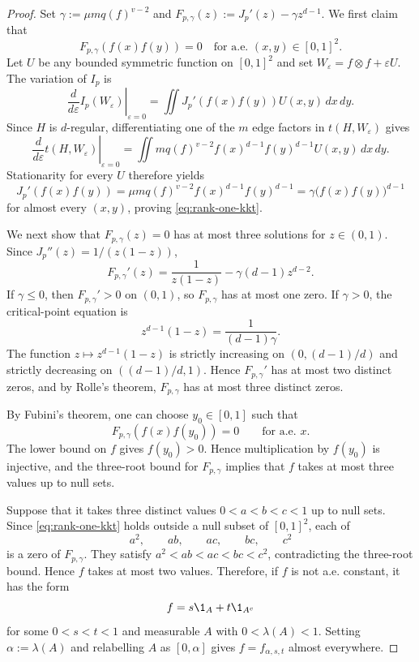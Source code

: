 \begin{proof}
Set $\gamma:=\mu m q(f)^{v-2}$ and $F_{p,\gamma}(z):=J_p'(z)-\gamma z^{d-1}$.
We first claim that
\begin{equation}
\label{eq:rank-one-kkt}
  F_{p,\gamma}(f(x)f(y))=0
  \quad\text{for a.e. }(x,y)\in[0,1]^2.
\end{equation}
Let $U$ be any bounded symmetric function on $[0,1]^2$ and set
$W_\varepsilon=f\otimes f+\varepsilon U$.  The variation of $I_p$ is
\[
  \left.\frac{d}{d\varepsilon}I_p(W_\varepsilon)\right|_{\varepsilon=0}
  =\iint J_p'(f(x)f(y))U(x,y)\,dx\,dy.
\]
Since $H$ is $d$-regular, differentiating one of the $m$ edge factors in
$t(H,W_\varepsilon)$ gives
\[
  \left.\frac{d}{d\varepsilon}t(H,W_\varepsilon)\right|_{\varepsilon=0}
  =\iint m q(f)^{v-2}f(x)^{d-1}f(y)^{d-1}
  U(x,y)\,dx\,dy.
\]
Stationarity for every $U$ therefore yields
\[
  J_p'(f(x)f(y))
  =\mu m q(f)^{v-2}f(x)^{d-1}f(y)^{d-1}
  =\gamma\bigl(f(x)f(y)\bigr)^{d-1}
\]
for almost every $(x,y)$, proving
\eqref{eq:rank-one-kkt}.

We next show that $F_{p,\gamma}(z)=0$ has at most three
solutions for $z\in(0,1)$.  Since $J_p''(z)=1/(z(1-z))$,
\[
  F_{p,\gamma}'(z)
  =\frac1{z(1-z)}-\gamma(d-1)z^{d-2}.
\]
If $\gamma\le0$, then $F_{p,\gamma}'>0$ on $(0,1)$, so
$F_{p,\gamma}$ has at most one zero.  If $\gamma>0$, the critical-point
equation is
\[
  z^{d-1}(1-z)=\frac1{(d-1)\gamma}.
\]
The function $z\mapsto z^{d-1}(1-z)$ is strictly increasing on
$(0,(d-1)/d)$ and strictly decreasing on $((d-1)/d,1)$.  Hence
$F_{p,\gamma}'$ has at most two distinct zeros,
and by Rolle's theorem, $F_{p,\gamma}$ has at most three distinct zeros.

By Fubini's theorem, one can choose $y_0\in[0,1]$ such that
\[
  F_{p,\gamma}(f(x)f(y_0))=0
  \qquad\text{for a.e. }x.
\]
The lower bound on $f$ gives $f(y_0)>0$.  Hence multiplication by
$f(y_0)$ is injective, and the three-root bound for $F_{p,\gamma}$ implies
that $f$ takes at most three values up to null sets.

Suppose that it takes three distinct values $0<a<b<c<1$ up to null sets.
Since \eqref{eq:rank-one-kkt} holds outside a null subset
of $[0,1]^2$, each of
\[
  a^2,\qquad ab,\qquad ac,\qquad bc,\qquad c^2
\]
is a zero of $F_{p,\gamma}$.  They satisfy
$a^2<ab<ac<bc<c^2$, contradicting the three-root bound.  Hence $f$ takes at
most two values.
Therefore, if $f$ is not a.e. constant, it has the form
\[
  f=s\1_A+t\1_{A^c}
\]
for some $0<s<t<1$ and measurable $A$ with $0<\lambda(A)<1$.  Setting
$\alpha:=\lambda(A)$ and relabelling $A$ as $[0,\alpha]$ gives
$f=f_{\alpha,s,t}$ almost everywhere.
\end{proof}

